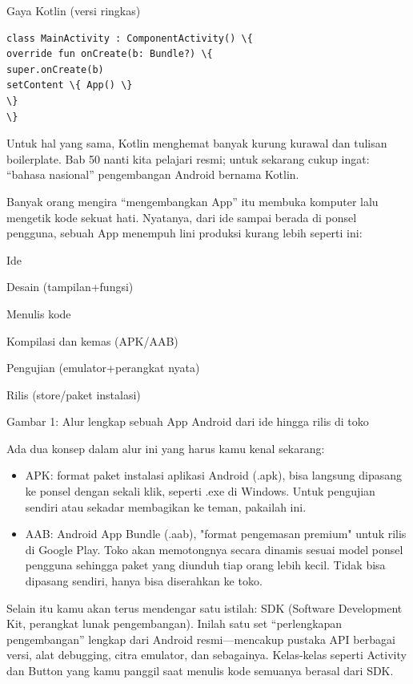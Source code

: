 Gaya Kotlin (versi ringkas)

\begin{lstlisting}
class MainActivity : ComponentActivity() \{
override fun onCreate(b: Bundle?) \{
super.onCreate(b)
setContent \{ App() \}
\}
\}
\end{lstlisting}

Untuk hal yang sama, Kotlin menghemat banyak kurung kurawal dan tulisan boilerplate. Bab 50 nanti kita pelajari resmi; untuk sekarang cukup ingat: “bahasa nasional” pengembangan Android bernama Kotlin.


Banyak orang mengira “mengembangkan App” itu membuka komputer lalu mengetik kode sekuat hati. Nyatanya, dari ide sampai berada di ponsel pengguna, sebuah App menempuh lini produksi kurang lebih seperti ini:

Ide

Desain (tampilan+fungsi)

Menulis kode

Kompilasi dan kemas (APK/AAB)

Pengujian (emulator+perangkat nyata)

Rilis (store/paket instalasi)

\begin{center}\small\color{gray}Gambar 1: Alur lengkap sebuah App Android dari ide hingga rilis di toko\end{center}

Ada dua konsep dalam alur ini yang harus kamu kenal sekarang:

\begin{itemize}
  \item APK: format paket instalasi aplikasi Android (.apk), bisa langsung dipasang ke ponsel dengan sekali klik, seperti .exe di Windows. Untuk pengujian sendiri atau sekadar membagikan ke teman, pakailah ini.
  \item AAB: Android App Bundle (.aab), "format pengemasan premium" untuk rilis di Google Play. Toko akan memotongnya secara dinamis sesuai model ponsel pengguna sehingga paket yang diunduh tiap orang lebih kecil. Tidak bisa dipasang sendiri, hanya bisa diserahkan ke toko.
\end{itemize}

Selain itu kamu akan terus mendengar satu istilah: SDK (Software Development Kit, perangkat lunak pengembangan). Inilah satu set “perlengkapan pengembangan” lengkap dari Android resmi—mencakup pustaka API berbagai versi, alat debugging, citra emulator, dan sebagainya. Kelas-kelas seperti Activity dan Button yang kamu panggil saat menulis kode semuanya berasal dari SDK.

